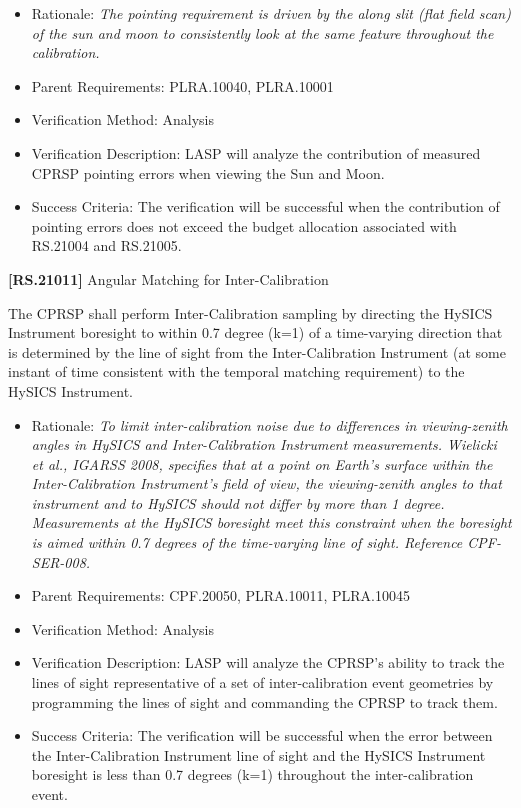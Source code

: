 \documentclass[12pt,oneside,oldfontcommands]{memoir}
\begin{document}
\begin{itemize}
\item{} Rationale: \emph{The pointing requirement is driven by the along slit (flat field scan) of the sun and moon to consistently look at the same feature throughout the calibration.}

\item{} Parent Requirements: PLRA.10040, PLRA.10001

\item{} Verification Method: Analysis

\item{} Verification Description: \gls{LASP} will analyze the contribution of \gls{measure}d \gls{CPRSP} \gls{point}ing errors when viewing the Sun and Moon.

\item{} Success Criteria: The verification will be successful when the contribution of \gls{point}ing errors does not exceed the budget allocation associated with \gls{RS}.21004 and \gls{RS}.21005.

\end{itemize}

\textbf{[RS.21011]} Angular Matching for Inter-Calibration

The \gls{CPRSP} shall perform Inter-Calibration sampling by directing the \gls{HySICS} Instrument boresight to within 0.7 degree (k=1) of a time-varying direction that is determined by the line of sight from the Inter-Calibration Instrument (at some instant of time consistent with the temporal matching requirement) to the \gls{HySICS} Instrument.

\begin{itemize}
\item{} Rationale: \emph{To limit inter-calibration noise due to differences in viewing-zenith angles in HySICS and Inter-Calibration Instrument measurements. Wielicki et al., IGARSS 2008, specifies that at a point on Earth's surface within the Inter-Calibration Instrument's field of view, the viewing-zenith angles to that instrument and to HySICS should not differ by more than 1 degree. Measurements at the HySICS boresight meet this constraint when the boresight is aimed within 0.7 degrees of the time-varying line of sight. Reference CPF-SER-008.}

\item{} Parent Requirements: \gls{CPF}.20050, PLRA.10011, PLRA.10045

\item{} Verification Method: Analysis

\item{} Verification Description: \gls{LASP} will analyze the \gls{CPRSP}'s ability to track the lines of sight representative of a set of inter-calibration event geometries by programming the lines of sight and commanding the \gls{CPRSP} to track them.

\item{} Success Criteria: The verification will be successful when the error between the Inter-Calibration Instrument line of sight and the \gls{HySICS} Instrument boresight is less than 0.7 degrees (k=1) throughout the inter-calibration event.

\end{itemize}
\end{document}
